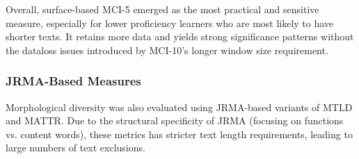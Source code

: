 Overall, surface-based MCI-5 emerged as the most practical and sensitive measure, especially for lower proficiency
learners who are most likely to have shorter texts. It retains more data and yields strong significance patterns
without the dataloss issues introduced by MCI-10's longer window size requirement.

\subsubsection{JRMA-Based Measures}

Morphological diversity was also evaluated using JRMA-based variants of MTLD and MATTR. Due to the structural
specificity of JRMA (focusing on functions vs. content words), these metrics has stricter text length requirements,
leading to large numbers of text exclusions.

